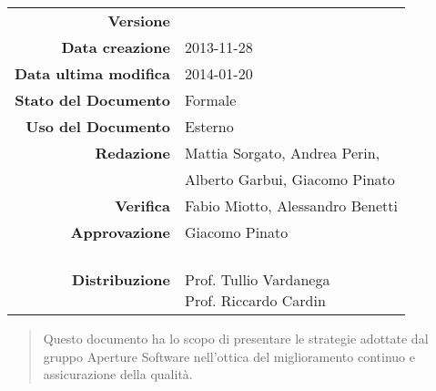 

\newcommand{\Versione}{\versionePianoDiQualifica{}}	%
\newcommand{\Data}{2013-11-28}						%
\newcommand{\DataUltimaModifica}{2014-01-20}
\newcommand{\TipoDocumento}{Piano di Qualifica}		%




\begin{center}
\begin{tabular}{r|l}
\textbf{Versione} & \Versione{} \\
\textbf{Data creazione} & \Data{} \\
\textbf{Data ultima modifica} & \DataUltimaModifica{} \\
\textbf{Stato del Documento} & Formale \\		%
\textbf{Uso del Documento} & Esterno \\			%
\textbf{Redazione} & Mattia Sorgato, Andrea Perin,\\			%
& Alberto Garbui, Giacomo Pinato\\
\textbf{Verifica} & Fabio Miotto, Alessandro Benetti\\%
\textbf{Approvazione} & Giacomo Pinato\\				%
\textbf{Distribuzione} & \parbox[t]{4cm}{\NomeGruppo{} \\ Prof. Tullio Vardanega \\ Prof. Riccardo Cardin \\ \Prop{} }\\
\end{tabular}
\end{center}

\vspace{0.05in}

\begin{abstract}
\begin{center}
Questo documento ha lo scopo di presentare le strategie adottate dal gruppo Aperture Software nell'ottica del miglioramento continuo e assicurazione della qualità.
\end{center}
\end{abstract}

